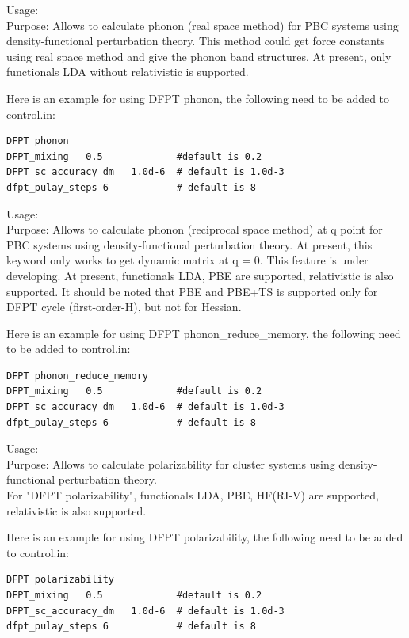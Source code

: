 {
{
Usage:  \\[1.0em]
  Purpose: Allows to calculate phonon (real space method) for PBC systems using density-functional perturbation theory. This method could get force constants using real space method and give the phonon band structures. At present, only functionals LDA without relativistic is supported.\\ }

Here is an example for using DFPT phonon,  the following need to be added to control.in:
\begin{verbatim} 
DFPT phonon
DFPT_mixing   0.5             #default is 0.2
DFPT_sc_accuracy_dm   1.0d-6  # default is 1.0d-3
dfpt_pulay_steps 6            # default is 8
\end{verbatim}  
  

{
Usage:  \\[1.0em]
  Purpose: Allows to calculate phonon (reciprocal space method) at q point for PBC systems using density-functional perturbation theory. At present, this keyword only works to get dynamic matrix at q = 0.  This feature is under developing. At present, functionals LDA, PBE are supported, relativistic is also supported. It should be noted that PBE and PBE+TS is supported only for DFPT cycle (first-order-H), but not for Hessian.\\}

Here is an example for using DFPT phonon\_reduce\_memory,  the following need to be added to control.in:
\begin{verbatim} 
DFPT phonon_reduce_memory
DFPT_mixing   0.5             #default is 0.2
DFPT_sc_accuracy_dm   1.0d-6  # default is 1.0d-3
dfpt_pulay_steps 6            # default is 8
\end{verbatim}  



{
Usage:  \\[1.0em]
  Purpose: Allows to calculate polarizability for cluster systems using density-functional perturbation theory.\\  For "DFPT polarizability", functionals LDA, PBE, HF(RI-V) are supported, relativistic is also supported.  }
  
Here is an example for using DFPT polarizability,  the following need to be added to control.in:
\begin{verbatim} 
DFPT polarizability
DFPT_mixing   0.5             #default is 0.2
DFPT_sc_accuracy_dm   1.0d-6  # default is 1.0d-3
dfpt_pulay_steps 6            # default is 8
\end{verbatim}  

}
